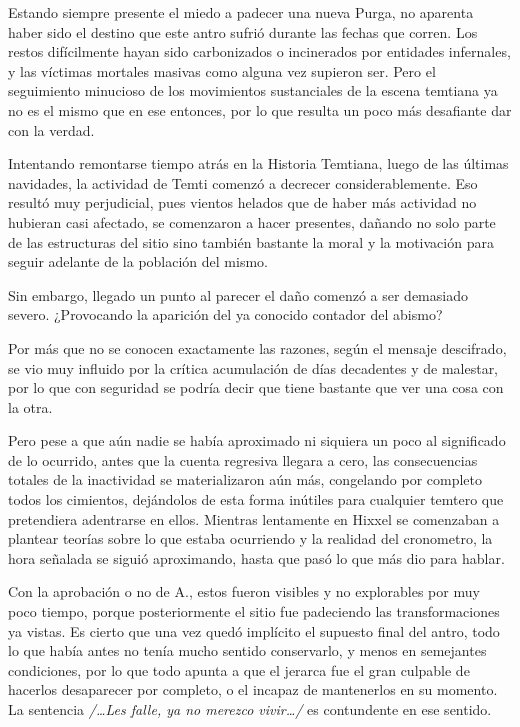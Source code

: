 \documentclass[
]{book}
\begin{document}
Estando siempre presente el miedo a padecer una nueva Purga, no aparenta haber sido el destino que este antro sufrió durante las fechas que corren. Los restos difícilmente hayan sido carbonizados o incinerados por entidades infernales, y las víctimas mortales masivas como alguna vez supieron ser. Pero el seguimiento minucioso de los movimientos sustanciales de la escena temtiana ya no es el mismo que en ese entonces, por lo que resulta un poco más desafiante dar con la verdad.

Intentando remontarse tiempo atrás en la Historia Temtiana, luego de las últimas navidades, la actividad de Temti comenzó a decrecer considerablemente. Eso resultó muy perjudicial, pues vientos helados que de haber más actividad no hubieran casi afectado, se comenzaron a hacer presentes, dañando no solo parte de las estructuras del sitio sino también bastante la moral y la motivación para seguir adelante de la población del mismo.

Sin embargo, llegado un punto al parecer el daño comenzó a ser demasiado severo. ¿Provocando la aparición del ya conocido contador del abismo?

Por más que no se conocen exactamente las razones, según el mensaje descifrado, se vio muy influido por la crítica acumulación de días decadentes y de malestar, por lo que con seguridad se podría decir que tiene bastante que ver una cosa con la otra.

Pero pese a que aún nadie se había aproximado ni siquiera un poco al significado de lo ocurrido, antes que la cuenta regresiva llegara a cero, las consecuencias totales de la inactividad se materializaron aún más, congelando por completo todos los cimientos, dejándolos de esta forma inútiles para cualquier temtero que pretendiera adentrarse en ellos. Mientras lentamente en Hixxel se comenzaban a plantear teorías sobre lo que estaba ocurriendo y la realidad del cronometro, la hora señalada se siguió aproximando, hasta que pasó lo que más dio para hablar.

Con la aprobación o no de A., estos fueron visibles y no explorables por muy poco tiempo, porque posteriormente el sitio fue padeciendo las transformaciones ya vistas. Es cierto que una vez quedó implícito el supuesto final del antro, todo lo que había antes no tenía mucho sentido conservarlo, y menos en semejantes condiciones, por lo que todo apunta a que el jerarca fue el gran culpable de hacerlos desaparecer por completo, o el incapaz de mantenerlos en su momento. La sentencia \emph{/\ldots Les falle, ya no merezco vivir\ldots/} es contundente en ese sentido.
\end{document}
